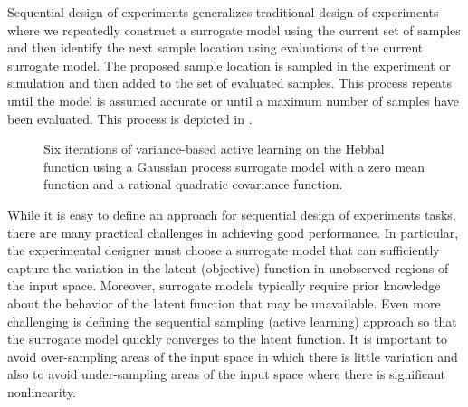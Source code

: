 \documentclass[conference,final]{IEEEtran}
\begin{document}
	Sequential design of experiments generalizes traditional design of experiments where we repeatedly construct a surrogate model using the current set of samples and then identify the next sample location using evaluations of the current surrogate model. The proposed sample location is sampled in the experiment or simulation and then added to the set of evaluated samples. This process repeats until the model is assumed accurate or until a maximum number of samples have been evaluated. This process is depicted in .
	
	\begin{figure}[htbp]
	    \centering
	     \hspace*{-1.5em}
	    
	     \hspace*{-1.5em}
	    
	     \hspace*{-1.5em}
	    
	    \caption{Six iterations of variance-based active learning on the Hebbal function \cite{hebbal2019bayesian} using a Gaussian process surrogate model with a zero mean function and a rational quadratic covariance function.}
	    \label{fig:sdoe_diagram}
	    \vspace*{-1em}
	\end{figure}
	
	While it is easy to define an approach for sequential design of experiments tasks, there are many practical challenges in achieving good performance. In particular, the experimental designer must choose a surrogate model that can sufficiently capture the variation in the latent (objective) function in unobserved regions of the input space. Moreover, surrogate models typically require prior knowledge about the behavior of the latent function that may be unavailable. Even more challenging is defining the sequential sampling (active learning) approach so that the surrogate model quickly converges to the latent function. It is important to avoid over-sampling areas of the input space in which there is little variation and also to avoid under-sampling areas of the input space where there is significant nonlinearity.
	
\end{document}
